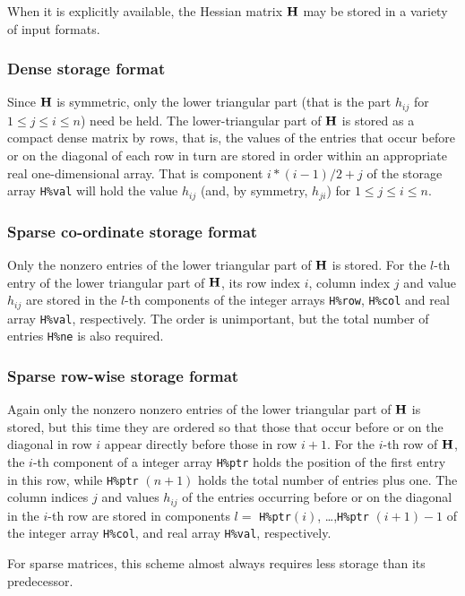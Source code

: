 \documentclass{galahad}
\begin{document}
\galmatrix
When it is explicitly available,  
the Hessian matrix ${\mathbf{H}}$ may be stored in a variety of input formats.

\subsubsection{Dense storage format}\label{dense}
Since ${\mathbf{H}}$ is symmetric, only the lower triangular part (that is the part 
$h_{ij}$ for $1 \leq j \leq i \leq n$) need be held. 
The lower-triangular part of ${\mathbf{H}}$ is stored as a compact 
dense matrix by rows, that is, the values of the entries that occur before
or on the diagonal of each row in turn are
stored in order within an appropriate real one-dimensional array.
That is component $i \ast (i-1)/2 + j$ of the storage array {\tt H\%val}  
will hold the value $h_{ij}$ (and, by symmetry, $h_{ji}$)
for $1 \leq j \leq i \leq n$.

\subsubsection{Sparse co-ordinate storage format}\label{coordinate}
Only the nonzero entries of the lower triangular part of ${\mathbf{H}}$ is stored. 
For the $l$-th entry of the lower triangular part of ${\mathbf{H}}$, 
its row index $i$, column index $j$ and value $h_{ij}$
are stored in the $l$-th components of the integer arrays {\tt H\%row}, 
{\tt H\%col} and real array {\tt H\%val}, respectively.
The order is unimportant, but the total
number of entries {\tt H\%ne} is also required. 

\subsubsection{Sparse row-wise storage format}\label{rowwise}
Again only the nonzero nonzero entries of the lower triangular 
part of ${\mathbf{H}}$ is stored, but this time they are ordered so that those 
that occur before or on the diagonal in row $i$ appear directly before those
in row $i+1$. For the $i$-th row of ${\mathbf{H}}$, the $i$-th component of a 
integer array {\tt H\%ptr} holds the position of the first entry in this row,
while {\tt H\%ptr} $(n+1)$ holds the total number of entries plus one.
The column indices $j$ and values $h_{ij}$ of the entries 
occurring before or on the diagonal in the $i$-th row are stored in components 
$l =$ {\tt H\%ptr}$(i)$, \ldots ,{\tt H\%ptr} $(i+1)-1$ of the 
integer array {\tt H\%col}, and real array {\tt H\%val}, respectively. 

For sparse matrices, this scheme almost always requires less storage than 
its predecessor.
\end{document}
